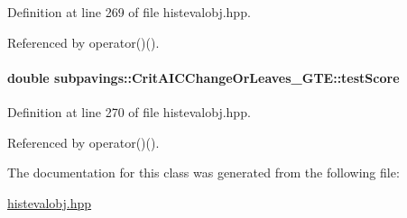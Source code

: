 \-Definition at line 269 of file histevalobj.\-hpp.



\-Referenced by operator()().

\hypertarget{classsubpavings_1_1CritAICChangeOrLeaves__GTE_a9ee854413b520e9da587f5a37a0fab6b}{
\paragraph[{test\-Score}]{\setlength{\rightskip}{0pt plus 5cm}double {\bf subpavings\-::\-Crit\-A\-I\-C\-Change\-Or\-Leaves\-\_\-\-G\-T\-E\-::test\-Score}}}\label{classsubpavings_1_1CritAICChangeOrLeaves__GTE_a9ee854413b520e9da587f5a37a0fab6b}


\-Definition at line 270 of file histevalobj.\-hpp.



\-Referenced by operator()().



\-The documentation for this class was generated from the following file\-:\begin{DoxyCompactItemize}
\item 
\hyperlink{histevalobj_8hpp}{histevalobj.\-hpp}\end{DoxyCompactItemize}
